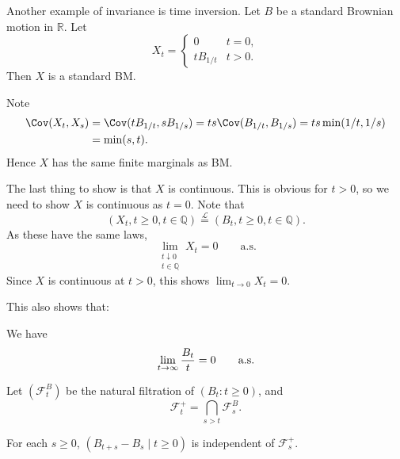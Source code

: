 \documentclass[12pt]{article}
\begin{document}
Another example of invariance is time inversion. Let $B$ be a standard Brownian motion in $\mathbb{R}$. Let
\[
X_t =
\begin{cases}
	0 & t = 0, \\
	t B_{1/t} & t > 0.
\end{cases}
\]
Then $X$ is a standard BM.

\begin{proofbox}
	Note
	\begin{align*}
		\Cov(X_t, X_s) &= \Cov(t B_{1/t}, s B_{1/s}) = ts \Cov(B_{1/t}, B_{1/s}) = ts \min(1/t, 1/s) \\
			       &= \min(s, t).
	\end{align*}
	Hence $X$ has the same finite marginals as BM.

	The last thing to show is that $X$ is continuous. This is obvious for $t > 0$, so we need to show $X$ is continuous as $t = 0$. Note that
	\[
		(X_t, t \geq 0, t \in \mathbb{Q}) \overset{\mathcal{L}}= (B_t, t \geq 0, t \in \mathbb{Q}).
	\]
	As these have the same laws,
	\[
		\lim_{\substack{t \downarrow 0 \\ t \in \mathbb{Q}}} X_t = 0 \qquad \text{a.s.}
	\]
	Since $X$ is continuous at $t > 0$, this shows $\lim_{t \to 0} X_t = 0$.
\end{proofbox}

This also shows that:
\begin{corollary}
	We have
	\[
		\lim_{t \to \infty} \frac{B_t}{t} = 0 \qquad\text{\normalfont{a.s.}}
	\]
\end{corollary}


\begin{definition}
	Let $(\mathcal{F}_t^B)$ be the natural filtration of $(B_t : t \geq 0)$, and 
	\[
	\mathcal{F}_t^{+} = \bigcap_{s > t} \mathcal{F}_s^B.
	\]
\end{definition}
\begin{theorem}
	For each $s \geq 0$, $(B_{t+s} - B_s \mid t \geq 0)$ is independent of $\mathcal{F}_s^{+}$.
\end{theorem}
\end{document}
